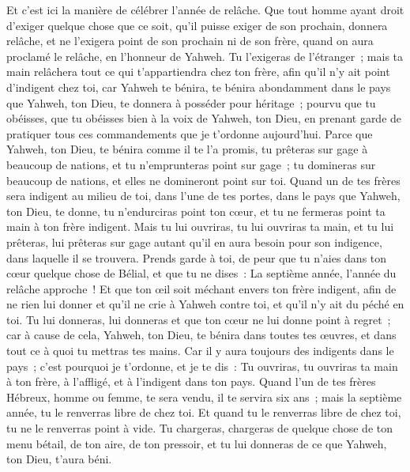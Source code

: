 \begin{multicols}{2}
Et c'est ici la manière de célébrer l'année de relâche. Que tout homme ayant droit d'exiger quelque chose que ce soit, qu'il puisse exiger de son prochain, donnera relâche, et ne l'exigera point de son prochain ni de son frère, quand on aura proclamé le relâche, en l'honneur de Yahweh.
Tu l'exigeras de l'étranger~; mais ta main relâchera tout ce qui t'appartiendra chez ton frère,
afin qu'il n'y ait point d'indigent chez toi, car Yahweh te bénira, te bénira abondamment dans le pays que Yahweh, ton Dieu, te donnera à posséder pour héritage~;
pourvu que tu obéisses, que tu obéisses bien à la voix de Yahweh, ton Dieu, en prenant garde de pratiquer tous ces commandements que je t'ordonne aujourd'hui.
Parce que Yahweh, ton Dieu, te bénira comme il te l'a promis, tu prêteras sur gage à beaucoup de nations, et tu n'emprunteras point sur gage~; tu domineras sur beaucoup de nations, et elles ne domineront point sur toi.
Quand un de tes frères sera indigent au milieu de toi, dans l'une de tes portes, dans le pays que Yahweh, ton Dieu, te donne, tu n'endurciras point ton cœur, et tu ne fermeras point ta main à ton frère indigent.
Mais tu lui ouvriras, tu lui ouvriras ta main, et tu lui prêteras, lui prêteras sur gage autant qu'il en aura besoin pour son indigence, dans laquelle il se trouvera.
Prends garde à toi, de peur que tu n'aies dans ton cœur quelque chose de Bélial, et que tu ne dises~: La septième année, l'année du relâche approche~! Et que ton œil soit méchant envers ton frère indigent, afin de ne rien lui donner et qu'il ne crie à Yahweh contre toi, et qu'il n'y ait du péché en toi.
Tu lui donneras, lui donneras et que ton cœur ne lui donne point à regret~; car à cause de cela, Yahweh, ton Dieu, te bénira dans toutes tes œuvres, et dans tout ce à quoi tu mettras tes mains.
Car il y aura toujours des indigents dans le pays~; c'est pourquoi je t'ordonne, et je te dis~: Tu ouvriras, tu ouvriras ta main à ton frère, à l'affligé, et à l'indigent dans ton pays.
Quand l'un de tes frères Hébreux, homme ou femme, te sera vendu, il te servira six ans~; mais la septième année, tu le renverras libre de chez toi.
Et quand tu le renverras libre de chez toi, tu ne le renverras point à vide.
Tu chargeras, chargeras de quelque chose de ton menu bétail, de ton aire, de ton pressoir, et tu lui donneras de ce que Yahweh, ton Dieu, t'aura béni.

\end{multicols}
